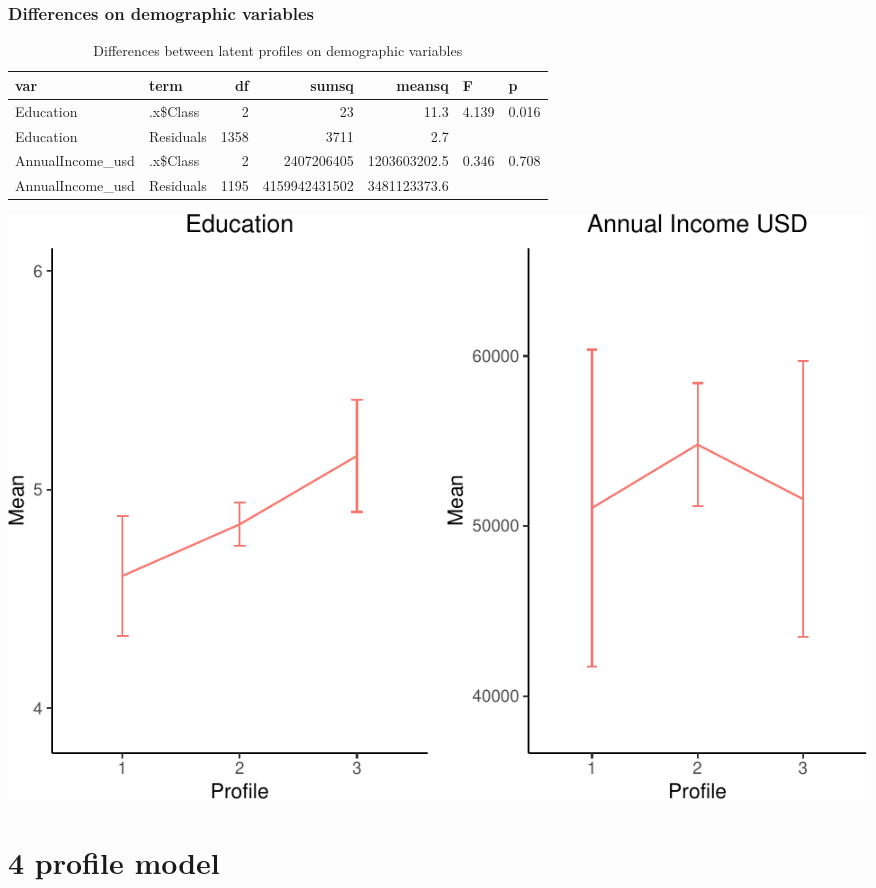 \documentclass[]{article}
\begin{document}
\hypertarget{differences-on-demographic-variables-1}{%
\subsubsection{Differences on demographic
variables}\label{differences-on-demographic-variables-1}}

\begin{table}[H]

\caption{\label{tab:unnamed-chunk-14}Differences between latent profiles on demographic variables}
\centering
\fontsize{6}{8}\selectfont
\begin{tabular}[t]{llrrrll}
\toprule
var & term & df & sumsq & meansq & F & p\\
\midrule
Education & .x\$Class & 2 & 23 & 11.3 & 4.139 & 0.016\\
Education & Residuals & 1358 & 3711 & 2.7 &  & \\
AnnualIncome\_usd & .x\$Class & 2 & 2407206405 & 1203603202.5 & 0.346 & 0.708\\
AnnualIncome\_usd & Residuals & 1195 & 4159942431502 & 3481123373.6 &  & \\
\bottomrule
\end{tabular}
\end{table}

\includegraphics{lpa_analyses_files/figure-latex/unnamed-chunk-14-1.pdf}

\newpage

\hypertarget{profile-model-2}{%
\section{4 profile model}\label{profile-model-2}}
\end{document}
